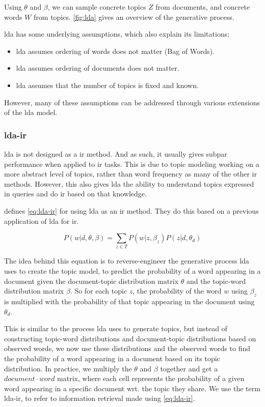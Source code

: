 Using $\theta$ and $\beta$, we can sample concrete topics $Z$ from documents, and concrete words $W$ from topics.
\autoref{fig:lda} gives an overview of the generative process.

\Gls{lda} has some underlying assumptions, which also explain its limitations\cite{blei2012topicmodels}:
\begin{itemize}
	\item \gls{lda} assumes ordering of words does not matter (Bag of Words).
	\item \gls{lda} assumes ordering of documents does not matter.
	\item \gls{lda} assumes that the number of topics is fixed and known.
\end{itemize}
However, many of these assumptions can be addressed through various extensions of the \gls{lda} model\cite{blei2012topicmodels}.

\subsubsection{\gls{lda}-\gls{ir}}\label{subsec:lda_ir}
\gls{lda} is not designed as a \acrlong{ir} method.
And as such, it usually gives subpar performance when applied to \gls{ir} tasks.
This is due to topic modeling working on a more abstract level of topics, rather than word frequency as many of the other \gls{ir} methods.
However, this also gives \gls{lda} the ability to understand topics expressed in queries and do \gls{ir} based on that knowledge.

\citeauthor{yang2009topic}\cite{yang2009topic} defines \autoref{eq:lda-ir} for using \gls{lda} as an \gls{ir} method.
They do this based on a previous application of \gls{lda} for \gls{ir}\cite{lda-ir}.

\begin{equation}\label{eq:lda-ir}
	P(w|d, \theta, \beta) = \sum_{z \in T} P(w|z,\beta_z) P(z|d,\theta_d)
\end{equation}

The idea behind this equation is to reverse-engineer the generative process \gls{lda} uses to create the topic model, to predict the probability of a word appearing in a document given the document-topic distribution matrix $\theta$ and the topic-word distribution matrix $\beta$.
So for each topic $z$, the probability of the word $w$ using $\beta_z$ is multiplied with the probability of that topic appearing in the document using $\theta_d$.

This is similar to the process \gls{lda} uses to generate topics, but instead of constructing topic-word distributions and document-topic distributions based on observed words, we now use these distributions and the observed words to find the probability of a word appearing in a document based on its topic distribution.
In practice, we multiply the $\theta$ and $\beta$ together and get a $document \cdot word$ matrix, where each cell represents the probability of a given word appearing in a specific document wrt. the topic they share.
We use the term \gls{lda}-\gls{ir}, to refer to information retrieval made using \autoref{eq:lda-ir}.
